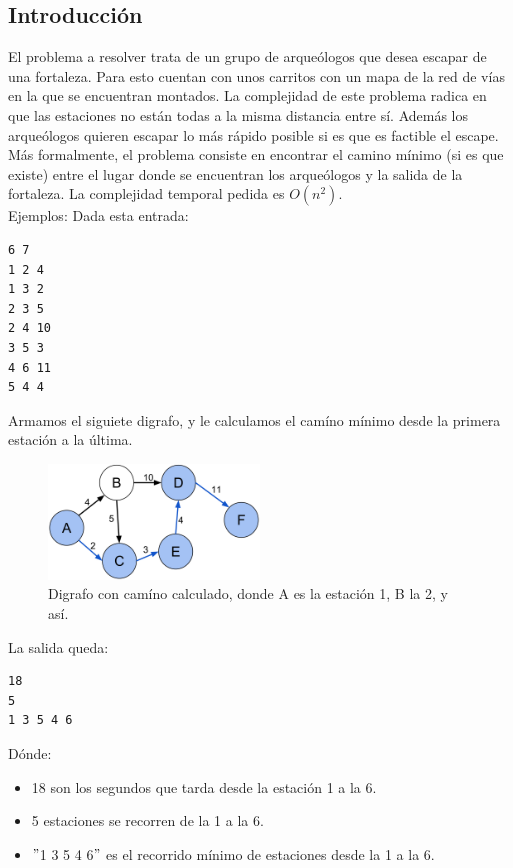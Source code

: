\subsection{Introducci\'on}
El problema a resolver trata de un grupo de arque\'ologos que desea escapar de una fortaleza. Para esto cuentan con unos carritos con un mapa de la red de v\'ias en la que se encuentran montados. La complejidad de este problema radica en que las estaciones no est\'an todas a la misma distancia entre s\'i. Adem\'as los arque\'ologos quieren escapar lo m\'as r\'apido posible si es que es factible el escape.
M\'as formalmente, el problema consiste en encontrar el camino m\'inimo (si es que existe) entre el lugar donde se encuentran los arque\'ologos y la salida de la fortaleza. La complejidad temporal pedida es $O(n^2)$. \\
Ejemplos:
Dada esta entrada:
\begin{verbatim}
6 7
1 2 4
1 3 2
2 3 5
2 4 10
3 5 3
4 6 11
5 4 4
\end{verbatim}
Armamos el siguiete digrafo, y le calculamos el camíno mínimo desde la primera estación a la última. 
\begin{figure}[H]
  \centering
  \includegraphics[width=0.5\textwidth]{Problema3/EjemploPath}
  \caption{Digrafo con camíno calculado, donde A es la estación 1, B la 2, y así.}
  \label{fig: ej1_exp1_columnas}
\end{figure}
La salida queda:
\begin{verbatim}
18
5
1 3 5 4 6
\end{verbatim}

Dónde:
\begin{itemize}
\item 18 son los segundos que tarda desde la estación 1 a la 6.
\item 5 estaciones se recorren de la 1 a la 6.
\item $"$1 3 5 4 6$"$ es el recorrido mínimo de estaciones desde la 1 a la 6.
\end{itemize}

